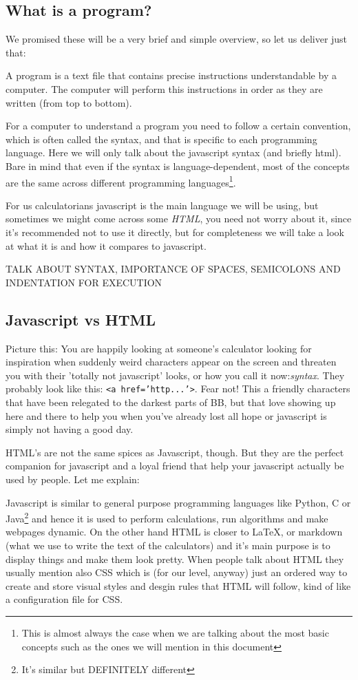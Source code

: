 \subsection{What is a program?} 
\label{sub:program}
We promised these will be a very brief and simple overview, so let us deliver just that:

A program is a text file that contains precise instructions understandable by a computer. The computer will perform this instructions in order as they are written (from top to bottom). 

For a computer to understand a program you need to follow a certain convention, which is often called the syntax, and that is specific to each programming language. Here we will only talk about the javascript syntax (and briefly html). Bare in mind that even if the syntax is language-dependent, most of the concepts are the same across different programming languages\footnote{This is almost always the case when we are talking about the most basic concepts such as the ones we will mention in this document}.

For us calculatorians javascript is the main language we will be using, but sometimes we might come across some \textit{HTML}, you need not worry about it, since it's recommended not to use it directly, but for completeness we will take a look at what it is and how it compares to javascript.

TALK ABOUT SYNTAX, IMPORTANCE OF SPACES, SEMICOLONS AND INDENTATION FOR EXECUTION
\subsection{Javascript vs HTML}
\label{sub:jsHtml}
Picture this: You are happily looking at someone's calculator looking for inspiration when suddenly weird characters appear on the screen and threaten you with their 'totally not javascript' looks, or how you call it now:\textit{syntax}. They probably look like this: \texttt{<a href='http...'>}. Fear not! This a friendly characters that have been relegated to the darkest parts of BB, but that love showing up here and there to help you when you've already lost all hope or javascript is simply not having a good day. 

HTML's are not the same spices as Javascript, though. But they are the perfect companion for javascript and a loyal friend that help your javascript actually be used by people. Let me explain:

Javascript is similar to general purpose programming languages like Python, C or Java\footnote{It's similar but DEFINITELY different} and hence it is used to perform calculations, run algorithms and make webpages dynamic. On the other hand HTML is closer to \LaTeX, or markdown (what we use to write the text of the calculators) and it's main purpose is to display things and make them look pretty. When people talk about HTML they usually mention also CSS which is (for our level, anyway) just an ordered way to create and store visual styles and desgin rules that HTML will follow, kind of like a configuration file for CSS.

